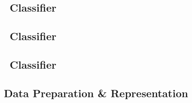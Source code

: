 \subsection{\nb\ Classifier}

\subsection{\rf\ Classifier}

\subsection{\svm\ Classifier}

\subsection{Data Preparation \& Representation}
